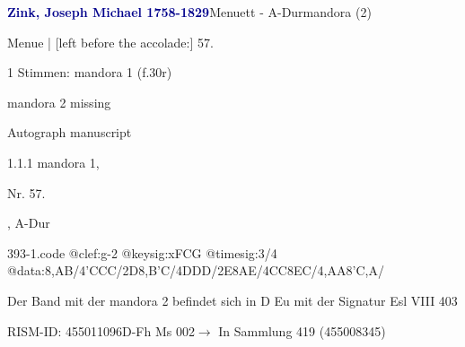 \documentclass[twocolumn, 12pt]{book}
\begin{document}
\par \vspace{16pt} \textcolor{darkblue}{\textbf{Zink, Joseph Michael  1758-1829}}\hfillplus{\textbf{[393]}}\newline Menuett - A-Dur\newline mandora (2)
\par \begin{itshape}[f.30r, at left:] Menue | [left before the accolade:] 57.\end{itshape} 
\par \textcolor{darkblue}{}  1 Stimmen: mandora 1  (f.30r)\newline \begin{small} mandora 2 missing\end{small} \newline Autograph manuscript
\par 1.1.1  mandora 1, \begin{itshape}Nr. 57.\end{itshape}, A-Dur  
\begin{filecontents*}{393-1.code}
@clef:g-2
@keysig:xFCG
@timesig:3/4
@data:{8,AB}/4'CCC/2D{8,B'C}/4DDD/2E{8AE}/4CC{8EC}/4,AA{8'C,A}/
\end{filecontents*}
\newline %
\par Der Band mit der mandora 2 befindet sich in D Eu mit der Signatur Esl VIII 403
\par RISM-ID: 455011096\newline D-Fh  Ms 002\newline $\rightarrow$ In Sammlung 419 (455008345)
      
\end{document}
